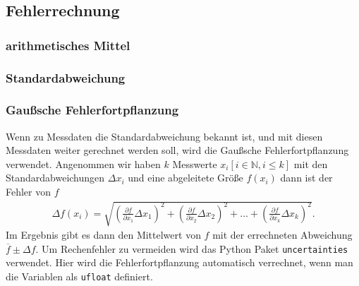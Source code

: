 \subsection{Fehlerrechnung}

\subsubsection{arithmetisches Mittel}


\subsubsection{Standardabweichung}


\subsubsection{Gaußsche Fehlerfortpflanzung}

Wenn zu Messdaten die Standardabweichung bekannt ist, und mit diesen Messdaten weiter gerechnet werden soll,
wird die Gaußsche Fehlerfortpflanzung verwendet. 
Angenommen wir haben $k$ Messwerte $x_i [i \in \mathbb{N}, i \leq k]$ mit den Standardabweichungen $\Delta x_i$
und eine abgeleitete Größe $f(x_i)$ dann ist der Fehler von $f$
\begin{align}
    \Delta f(x_i) = \sqrt{
    \left(\frac{\partial f}{\partial x_1} \Delta x_1\right)^2%
     + \left(\frac{\partial f}{\partial x_2} \Delta x_2\right)^2%
     + \dots%
     + \left(\frac{\partial f}{\partial x_k} \Delta x_k\right)^2%
    }.
\end{align} 
Im Ergebnis gibt es dann den Mittelwert von $f$ mit der errechneten Abweichung $\overline{f} \pm \Delta f $.
Um Rechenfehler zu vermeiden wird das Python Paket \texttt{uncertainties} \cite[][]{uncertainties} verwendet.
Hier wird die Fehlerfortpflanzung automatisch verrechnet, wenn man die Variablen als \texttt{ufloat} definiert.


